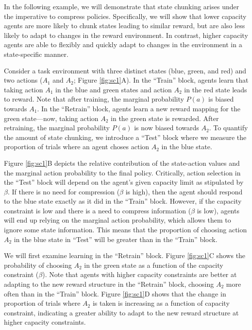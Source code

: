\documentclass[11pt]{article}
\begin{document}
In the following example, we will demonstrate that state chunking arises under the imperative to compress policies. Specifically, we will show that lower capacity agents are more likely to chunk states leading to similar reward, but are also less likely to adapt to changes in the reward environment. In contrast, higher capacity agents are able to flexibly and quickly adapt to changes in the environment in a state-specific manner.

Consider a task environment with three distinct states (blue, green, and red) and two actions ($A_1$ and $A_2$; Figure \ref{fig:sc1}A). In the ``Train'' block, agents learn that taking action $A_1$ in the blue and green states and action $A_2$ in the red state leads to reward. Note that after training, the marginal probability $P(a)$ is biased towards $A_1$. In the ``Retrain'' block, agents learn a new reward mapping for the green state---now, taking action $A_2$ in the green state is rewarded. After retraining, the marginal probability $P(a)$ is now biased towards $A_2$. To quantify the amount of state chunking, we introduce a ``Test'' block where we measure the proportion of trials where an agent choses action $A_2$ in the blue state. 

Figure \ref{fig:sc1}B depicts the relative contribution of the state-action values and the marginal action probability to the final policy. Critically, action selection in the ``Test'' block will depend on the agent's given capacity limit as stipulated by $\beta$. If there is no need for compression ($\beta$ is high), then the agent should respond to the blue state exactly as it did in the ``Train'' block. However, if the capacity constraint is low and there is a need to compress information ($\beta$ is low), agents will end up relying on the marginal action probability, which allows them to ignore some state information. This means that the proportion of choosing action $A_2$ in the blue state in ``Test'' will be greater than in the ``Train'' block. 

We will first examine learning in the ``Retrain'' block. Figure \ref{fig:sc1}C shows the probability of choosing $A_2$ in the green state as a function of the capacity constraint ($\beta$). Note that agents with higher capacity constraints are better at adapting to the new reward structure in the ``Retrain'' block, choosing $A_2$ more often than in the ``Train'' block. Figure \ref{fig:sc1}D shows that the change in proportion of trials where $A_2$ is taken is increasing as a function of capacity constraint, indicating a greater ability to adapt to the new reward structure at higher capacity constraints.
\end{document}
